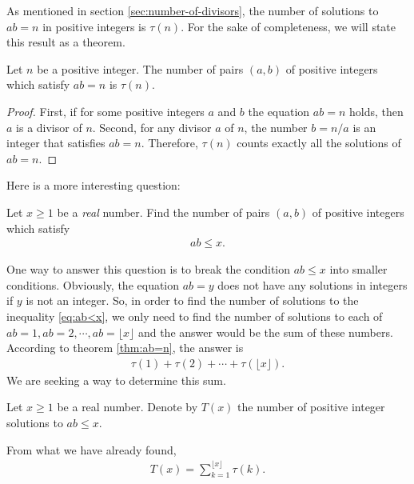 \documentclass[12pt]{subfile}
\begin{document}
As mentioned in section \ref{sec:number-of-divisors}, the number of solutions to $ab = n$ in positive integers is $\tau(n)$. For the sake of completeness, we will state this result as a theorem.

	\begin{theorem}\label{thm:ab=n}
		Let $n$ be a positive integer. The number of pairs $(a,b)$ of positive integers which satisfy $ab=n$ is $\tau(n)$.
	\end{theorem}

	\begin{proof}
		First, if for some positive integers $a$ and $b$ the equation $ab = n$ holds, then $a$ is a divisor of $n$. Second, for any divisor $a$ of $n$, the number $b = n/a$ is an integer that satisfies $ab = n$. Therefore, $\tau(n)$ counts exactly all the solutions of $ab=n$.
	\end{proof}


Here is a more interesting question:

	\begin{question}
		Let $x \geq 1$ be a \textit{real} number. Find the number of pairs $(a, b)$ of positive integers which satisfy
			\begin{align}
				ab \leq x. \label{eq:ab<x}
			\end{align}
	\end{question}

One way to answer this question is to break the condition $ab \leq x$ into smaller conditions. Obviously, the equation $ab = y$ does not have any solutions in integers if $y$ is not an integer. So, in order to find the number of solutions to the inequality \ref{eq:ab<x}, we only need to find the number of solutions to each of $ab = 1, ab= 2, \cdots, ab= \lfloor x \rfloor$ and the answer would be the sum of these numbers. According to theorem \ref{thm:ab=n}, the answer is
	\begin{align*}
		\tau(1) + \tau(2) + \cdots + \tau(\lfloor x \rfloor).
	\end{align*}
We are seeking a way to determine this sum.

	\begin{definition}
		Let $x \geq 1$ be a real number. Denote by $T(x)$ the number of positive integer solutions to $ab \leq x$.
	\end{definition}

From what we have already found,
	\begin{align}
		T(x) = \sum_{k=1}^{\lfloor x \rfloor} \tau(k).\label{eq:T(x)-1}
	\end{align}
\end{document}
